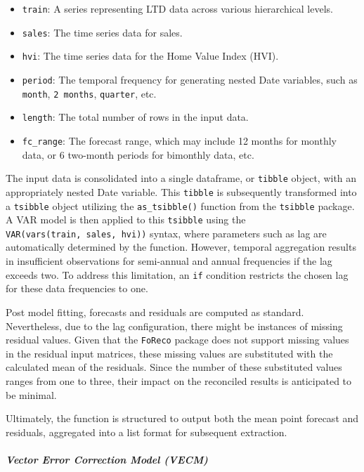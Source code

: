 \documentclass[11pt,a4paper,]{article}
\providecommand{\tightlist}{%
  \setlength{\itemsep}{0pt}\setlength{\parskip}{0pt}}
\begin{document}
\begin{itemize}
\tightlist
\item
  \texttt{train}: A series representing LTD data across various hierarchical levels.
\item
  \texttt{sales}: The time series data for sales.
\item
  \texttt{hvi}: The time series data for the Home Value Index (HVI).
\item
  \texttt{period}: The temporal frequency for generating nested Date variables, such as \texttt{month}, \texttt{2\ months}, \texttt{quarter}, etc.
\item
  \texttt{length}: The total number of rows in the input data.
\item
  \texttt{fc\_range}: The forecast range, which may include 12 months for monthly data, or 6 two-month periods for bimonthly data, etc.
\end{itemize}

The input data is consolidated into a single dataframe, or \texttt{tibble} object, with an appropriately nested Date variable. This \texttt{tibble} is subsequently transformed into a \texttt{tsibble} object utilizing the \texttt{as\_tsibble()} function from the \texttt{tsibble} package. A VAR model is then applied to this \texttt{tsibble} using the \texttt{VAR(vars(train,\ sales,\ hvi))} syntax, where parameters such as lag are automatically determined by the function. However, temporal aggregation results in insufficient observations for semi-annual and annual frequencies if the lag exceeds two. To address this limitation, an \texttt{if} condition restricts the chosen lag for these data frequencies to one.

Post model fitting, forecasts and residuals are computed as standard. Nevertheless, due to the lag configuration, there might be instances of missing residual values. Given that the \texttt{FoReco} package does not support missing values in the residual input matrices, these missing values are substituted with the calculated mean of the residuals. Since the number of these substituted values ranges from one to three, their impact on the reconciled results is anticipated to be minimal.

Ultimately, the function is structured to output both the mean point forecast and residuals, aggregated into a list format for subsequent extraction.

\subparagraph{Vector Error Correction Model (VECM)}\label{vector-error-correction-model-vecm}
\end{document}
